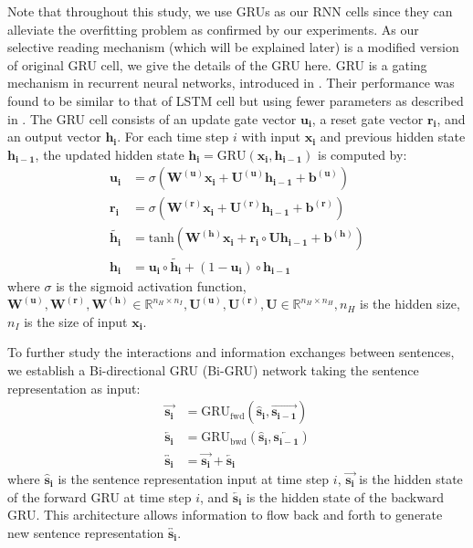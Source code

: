 \documentclass[11pt,a4paper]{article}
\begin{document}
Note that throughout this study, we use GRUs as our RNN cells since they can alleviate the overfitting problem as confirmed by our experiments.
As our selective reading mechanism (which will be explained later) is a modified version of original GRU cell, we give the details of the GRU here.
GRU is a gating mechanism in recurrent neural networks, introduced in \cite{Cho2014Learning}. Their performance was found to be similar to that of LSTM cell but using fewer parameters as described in \cite{hochreiter1997long}.
The GRU cell consists of an update gate vector $\bm{u_i}$, a reset gate vector $\bm{r_i}$, and an output vector $\bm{h_i}$.
For each time step $i$ with input $\bm{x_{i}}$ and previous hidden state $\bm{h_{i-1}}$, the updated hidden state $\bm{h_{i}}=\text{GRU}(\bm{x_{i}},\bm{h_{i-1}})$ is computed by:
\begin{align}
\bm{u_{i}} &=\sigma(\bm{W^{(u)}}\bm{x_{i}}+\bm{U^{(u)}}\bm{h_{i-1}}+\bm{b^{(u)}})  \label{gated} \\
\bm{r_{i}} &=\sigma(\bm{W^{(r)}}\bm{x_{i}}+\bm{U^{(r)}}\bm{h_{i-1}}+\bm{b^{(r)}})  \\
\bm{\tilde{h_{i}}}&=\text{tanh}(\bm{W^{(h)}x_{i}}+\bm{r_{i}}\circ \bm{Uh_{i-1}}+\bm{b^{(h)}}) \\
\bm{h_{i}}&=\bm{u_{i}}\circ \bm{\tilde{h_{i}}}+(1-\bm{u_{i}})\circ \bm{h_{i-1} } \label{hi}
\end{align}
where $\sigma$ is the sigmoid activation function, $\bm{W^{(u)}}, \bm{W^{(r)}}, \bm{W^{(h)}} \in \mathbb{R}^{n_{H}\times n_{I}},\bm{U^{(u)}},\bm{U^{(r)}},\bm{U}\in \mathbb{R}^{n_{H}\times n_{H}}, n_{H}$ is the hidden size, $n_{I}$ is the size of input $\bm{x_{i}}$.

To further study the interactions and information exchanges between sentences, we establish a Bi-directional GRU (Bi-GRU) network taking the sentence representation as input:
\begin{align}
\bm{\overrightarrow{s_{i}}} & =\text{GRU}_{\text{fwd}}(\bm{\hat{s}_{i}},\bm{\overrightarrow{s_{i-1}}}) \\
\bm{\overleftarrow{s_{i}}} & =\text{GRU}_{\text{bwd}}(\bm{\hat{s}_{i}},\bm{\overleftarrow{s_{i-1}}}) \\
\bm{\overleftrightarrow{s_{i}}}& =\bm{\overrightarrow{s_{i}}}+\bm{\overleftarrow{s_{i}}}
\end{align}
where $\bm{\hat{s}_{i}}$ is the sentence representation input at time step $i$, $\overrightarrow{\bm{s_{i}}}$ is the hidden state of the forward GRU at time step $i$, and $\overleftarrow{\bm{s_{i}}}$ is the hidden state of the backward GRU.
This architecture allows information to flow back and forth to generate new sentence representation $\bm{\overleftrightarrow{s_{i}}}$.
\end{document}
